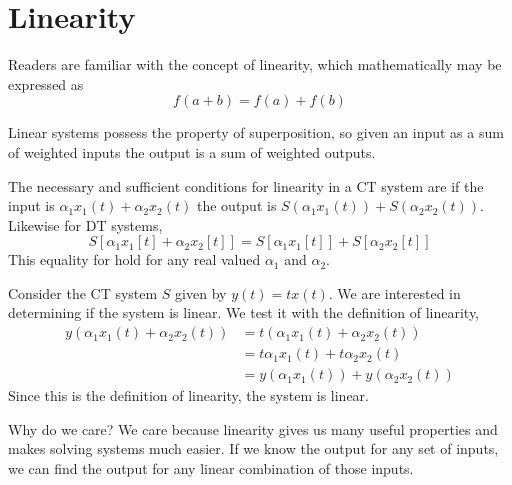 \section{Linearity}
Readers are familiar with the concept
of linearity, which mathematically
may be expressed as
\begin{equation}
    f(a + b) = f(a) + f(b)
\end{equation}

Linear systems possess the property
of superposition, so given an
input as a sum of weighted inputs
the output is a sum of weighted outputs.

The necessary and sufficient
conditions for linearity in a CT
system are
if the input is $\alpha_1x_1(t)
    + \alpha_2x_2(t)$ the output
is $S(\alpha_1x_1(t)) + S(\alpha_2x_2(t))$.
Likewise for DT systems,
\begin{equation}
    S[\alpha_1x_1[t] + \alpha_2x_2[t]] = S[\alpha_1x_1[t]] + S[\alpha_2x_2[t]]
\end{equation}
This equality for hold for any real
valued $\alpha_1$ and $\alpha_2$.

Consider the CT system $S$ given
by $y(t) = tx(t)$. We are interested
in determining if the system is
linear. We test it with the definition
of linearity,
\begin{align}
    y(\alpha_1x_1(t) + \alpha_2x_2(t)) & = t(\alpha_1x_1(t) + \alpha_2x_2(t))    \\
                                       & = t\alpha_1x_1(t) + t\alpha_2x_2(t)     \\
                                       & = y(\alpha_1x_1(t)) + y(\alpha_2x_2(t))
\end{align}
Since this is the definition of linearity, the
system is linear.

Why do we care? We care because linearity
gives us many useful properties and
makes solving systems much easier.
If we know the output for any set of
inputs, we can find the output for
any linear combination of those inputs.
